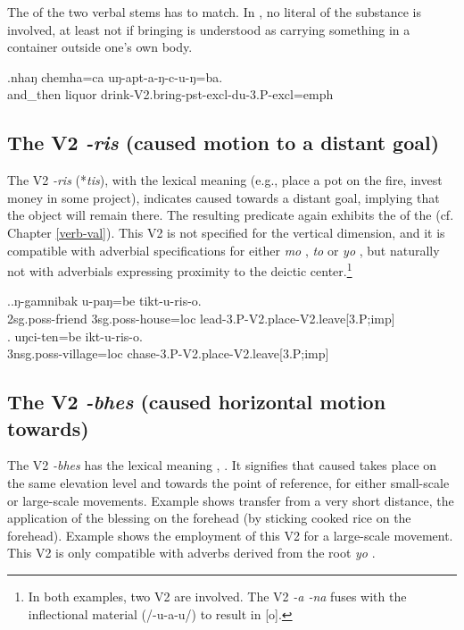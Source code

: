 The  of the two verbal stems has to match. In \Next, no literal  of the substance is involved, at least not if bringing is understood as carrying something in a container outside one's own body.

\exg.nhaŋ chemha=ca uŋ-apt-a-ŋ-c-u-ŋ=ba.\\
and\_then liquor  drink{\sc -V2.bring-pst-excl-du-3.P-excl=emph}\\


\subsection{The V2 \emph{-ris} (caused motion to a distant goal)}\label{V2-place}%

The V2 \emph{-ris} (*\emph{tis}), with the lexical meaning  (e.g., place a pot on the fire, invest money in some project),  indicates caused  towards a distant goal, implying that the object will remain there. The resulting predicate again exhibits  the  of the  (cf. Chapter \ref{verb-val}). This V2 is not specified for the vertical dimension, and it is compatible with adverbial specifications for either \emph{mo} , \emph{to}  or \emph{yo} , but naturally not with adverbials expressing proximity to the deictic center.\footnote{In both examples, two V2 are involved. The V2 \emph{-a \ti -na}  fuses with the inflectional material (/-u-a-u/) to result in [o].}

\ex.\ag.ŋ-gamnibak  u-paŋ=be tikt-u-ris-o.\\
{\sc 2sg.poss-}friend {\sc 3sg.poss-}house{\sc =loc}  lead{\sc -3.P-V2.place-V2.leave[3.P;imp]}\\
\bg. uŋci-ten=be ikt-u-ris-o.\\
{\sc 3nsg.poss-}village{\sc =loc} chase{\sc -3.P-V2.place-V2.leave[3.P;imp]}\\
 

\subsection{The V2 \emph{-bhes} (caused horizontal motion towards)} \label{V2-bhes}%

The V2 \emph{-bhes}  has the lexical meaning , . It signifies that  caused  takes place on the same elevation  level and towards the point of reference, for either  small-scale or large-scale movements.  Example \Next[a] shows  transfer from a very short distance, the application of the blessing on the forehead (by sticking cooked rice on the forehead). Example \Next[b] shows the employment of this V2 for a large-scale movement. This V2 is only compatible with adverbs derived from the root \emph{yo} . 


